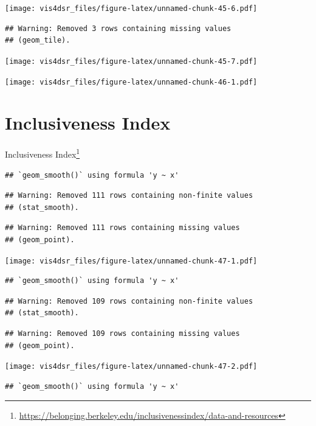\documentclass[
]{krantz}
\renewcommand{\href}[2]{#2\footnote{\url{#1}}}
\begin{document}
\texttt{[image: vis4dsr\_files/figure-latex/unnamed-chunk-45-6.pdf]}

\begin{verbatim}
## Warning: Removed 3 rows containing missing values
## (geom_tile).
\end{verbatim}

\texttt{[image: vis4dsr\_files/figure-latex/unnamed-chunk-45-7.pdf]}

\texttt{[image: vis4dsr\_files/figure-latex/unnamed-chunk-46-1.pdf]}

\hypertarget{inclusiveness-index}{%
\section*{Inclusiveness Index}\label{inclusiveness-index}}


\href{https://belonging.berkeley.edu/inclusivenessindex/data-and-resources}{Inclusiveness Index}

\begin{verbatim}
## `geom_smooth()` using formula 'y ~ x'
\end{verbatim}

\begin{verbatim}
## Warning: Removed 111 rows containing non-finite values
## (stat_smooth).
\end{verbatim}

\begin{verbatim}
## Warning: Removed 111 rows containing missing values
## (geom_point).
\end{verbatim}

\texttt{[image: vis4dsr\_files/figure-latex/unnamed-chunk-47-1.pdf]}

\begin{verbatim}
## `geom_smooth()` using formula 'y ~ x'
\end{verbatim}

\begin{verbatim}
## Warning: Removed 109 rows containing non-finite values
## (stat_smooth).
\end{verbatim}

\begin{verbatim}
## Warning: Removed 109 rows containing missing values
## (geom_point).
\end{verbatim}

\texttt{[image: vis4dsr\_files/figure-latex/unnamed-chunk-47-2.pdf]}

\begin{verbatim}
## `geom_smooth()` using formula 'y ~ x'
\end{verbatim}
\end{document}
